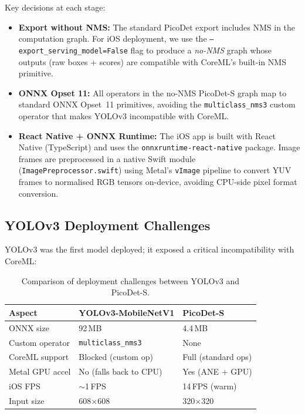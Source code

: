 Key decisions at each stage:

\begin{itemize}[leftmargin=1.5em]
  \item \textbf{Export without NMS:} The standard PicoDet export
    includes NMS in the computation graph.  For iOS deployment, we use
    the \texttt{--export\_serving\_model=False} flag to produce a
    \emph{no-NMS} graph whose outputs (raw boxes + scores) are compatible
    with CoreML's built-in NMS primitive.

  \item \textbf{ONNX Opset 11:} All operators in the no-NMS PicoDet-S
    graph map to standard ONNX Opset~11 primitives, avoiding the
    \texttt{multiclass\_nms3} custom operator that makes YOLOv3
    incompatible with CoreML.

  \item \textbf{React Native + ONNX Runtime:} The iOS app is built with
    React Native (TypeScript) and uses the
    \texttt{onnxruntime-react-native} package.  Image frames are
    preprocessed in a native Swift module
    (\texttt{ImagePreprocessor.swift}) using Metal's \texttt{vImage}
    pipeline to convert YUV frames to normalised RGB tensors on-device,
    avoiding CPU-side pixel format conversion.
\end{itemize}

\subsection{YOLOv3 Deployment Challenges}

YOLOv3 was the first model deployed; it exposed a critical
incompatibility with CoreML:

\begin{table}[H]
\centering
\caption{Comparison of deployment challenges between YOLOv3 and PicoDet-S.}
\label{tab:deploy_compare}
\begin{tabular}{lll}
\toprule
\textbf{Aspect} & \textbf{YOLOv3-MobileNetV1} & \textbf{PicoDet-S} \\
\midrule
ONNX size       & 92\,MB  & 4.4\,MB \\
Custom operator & \texttt{multiclass\_nms3} & None \\
CoreML support  & Blocked (custom op) & Full (standard ops) \\
Metal GPU accel & No (falls back to CPU) & Yes (ANE + GPU) \\
iOS FPS         & $\sim$1\,FPS & 14\,FPS (warm) \\
Input size      & 608$\times$608 & 320$\times$320 \\
\bottomrule
\end{tabular}
\end{table}

